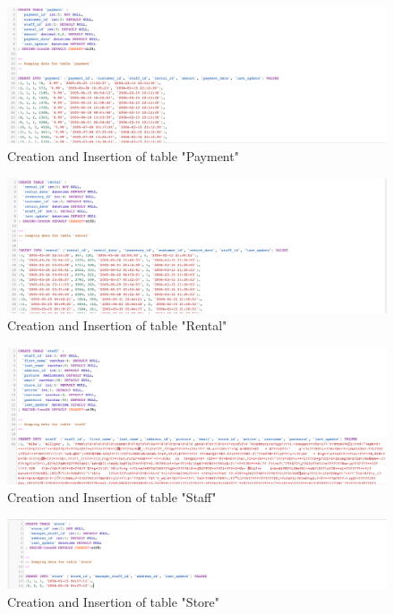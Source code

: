 \documentclass{article}
\begin{document}
	\begin{figure}[H]
		\includegraphics[width=\textwidth]{table_payment_cins}
		\caption{Creation and Insertion of table "Payment"}	
	\end{figure}
	\begin{figure}[H]
		\includegraphics[width=\textwidth]{table_rental_cins}
		\caption{Creation and Insertion of table "Rental"}	
	\end{figure}
	\begin{figure}[H]
		\includegraphics[width=\textwidth]{table_staff_cins}
		\caption{Creation and Insertion of table "Staff"}	
	\end{figure}
	\begin{figure}[H]
		\includegraphics[width=\textwidth]{table_store_cins}
		\caption{Creation and Insertion of table "Store"}	
	\end{figure}
\end{document}
